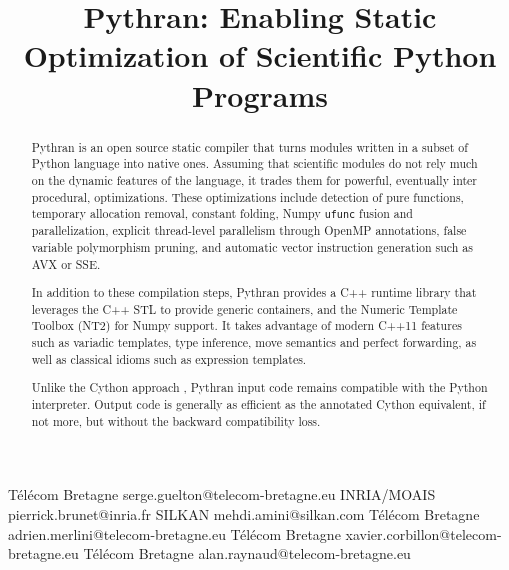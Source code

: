 \documentclass[10pt, onecolumn, preprint]{sigplanconf}
\begin{document}
\title{Pythran: Enabling Static Optimization of Scientific Python Programs}

           {T{\'e}l{\'e}com Bretagne}
           {serge.guelton@telecom-bretagne.eu}
           {INRIA/MOAIS}
           {pierrick.brunet@inria.fr}
           {SILKAN}
           {mehdi.amini@silkan.com}
           {T{\'e}l{\'e}com Bretagne}
           {adrien.merlini@telecom-bretagne.eu}
           {T{\'e}l{\'e}com Bretagne}
           {xavier.corbillon@telecom-bretagne.eu}
           {T{\'e}l{\'e}com Bretagne}
           {alan.raynaud@telecom-bretagne.eu}

\maketitle

\begin{abstract}

    Pythran is an open source static compiler that turns modules written
    in a subset of Python language into native ones. Assuming that scientific
    modules do not rely much on the dynamic features of the language, it trades
    them for powerful, eventually inter procedural, optimizations.
    These optimizations include detection of pure functions, temporary
    allocation removal,
    constant folding, Numpy \texttt{ufunc} fusion and parallelization, explicit
    thread-level parallelism through OpenMP annotations, false variable
    polymorphism pruning, and automatic vector instruction generation such as
    AVX or SSE.

    In addition to these compilation steps, Pythran provides a C++ runtime 
    library that
    leverages the C++ STL to provide generic containers, and the Numeric 
    Template Toolbox (NT2) for Numpy support. It takes advantage of modern C++11
    features such as variadic templates, type inference, move semantics and
    perfect forwarding, as well as classical idioms such as expression templates.

    Unlike the Cython approach , Pythran input code remains compatible with the
    Python interpreter. Output code is generally as efficient as the annotated
    Cython equivalent, if not more, but without the backward compatibility
    loss.


\end{abstract}
\end{document}
